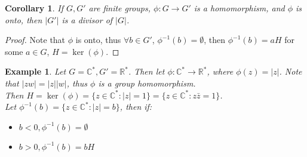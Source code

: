 \documentclass{article}
\theoremstyle{MyNonumberplain}
\theoremstyle{break}
\newtheorem*{proof}{Proof. }
\newcommand{\p}{\phi}
\theoremstyle{break}
\newtheorem{corollary}{Corollary}[theorem]
\newtheorem{example}{Example}[section]
\theoremstyle{break}
\theoremstyle{definition}
\theoremstyle{break}
\begin{document}
\begin{thmbox}
    \begin{corollary}
        If $G, G'$ are finite groups, $\p : G \rightarrow G'$ is a homomorphism, and
        $\p$ is onto, then $| G' |$ is a divisor of $| G |$.
    \end{corollary}
    \begin{prfbox}
        \begin{proof}
            Note that $\p$ is onto, thus $\forall b \in G'$, $\p^{- 1} (b) = \emptyset$,
            then $\p^{- 1} (b) = a H$ for some $a \in G$, $H = \ker \left( \p \right)$.
        \end{proof}
    \end{prfbox}
\end{thmbox}


\begin{expbox}
    \begin{example}
        Let $G =\mathbb{C}^{\ast}, G' =\mathbb{R}^{\ast}$. Then let $\p :
        \mathbb{C}^{\ast} \rightarrow \mathbb{R}^{\ast}$, where $\p (z) = | z |$. Note
        that $| z w | = | z | | w |$, thus $\p$ is a group homomorphism.\\

        Then $H = \ker \left( \p \right) = \{ z \in \mathbb{C}^{\ast} : | z | = 1 \}
        = \{ z \in \mathbb{C}^{\ast} : z \bar{z} = 1 \}$.\\

        Let $\p^{- 1} (b) = \{ z \in \mathbb{C}^{\ast} : | z | = b \}$, then if:\\
        \begin{itemize}
        \item $b < 0, \p^{- 1} (b) = \emptyset$\\
        
        \item $b > 0, \p^{- 1} (b) = b H$
        \end{itemize}
    \end{example}
\end{expbox}
\end{document}
